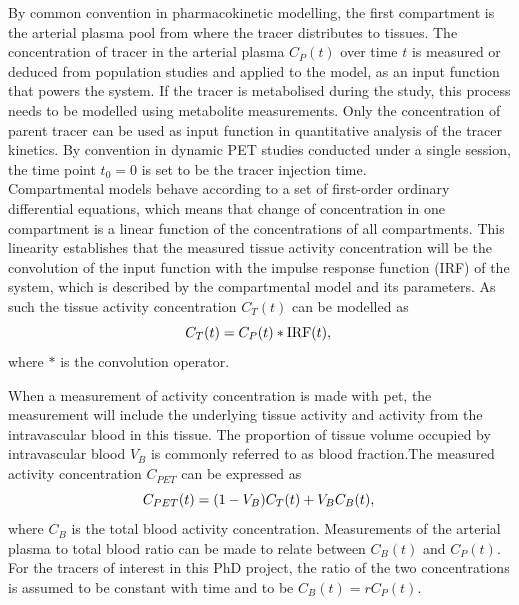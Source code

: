 By common convention in pharmacokinetic modelling, the first compartment is the arterial plasma pool from where the tracer distributes to tissues. The concentration of tracer in the arterial plasma $C_P(t)$ over time $t$ is measured or deduced from population studies and applied to the model, as an input function that powers the system.
If the tracer is metabolised during the study, this process needs to be modelled using metabolite measurements. Only the concentration of parent tracer can be used as input function in quantitative analysis of the tracer kinetics.
By convention in dynamic PET studies conducted under a single session, the time point $t_0=0$ is set to be the tracer injection time. \\
Compartmental models behave according to a set of first-order ordinary differential equations, which means that change of concentration in one compartment is a linear function of the concentrations of all compartments. This linearity establishes that the measured tissue activity concentration will be the convolution of the input function with the impulse response function (IRF) of the system, which is described by the compartmental model and its parameters.
As such the tissue activity concentration $C_T(t)$ can be modelled as
\begin{equation}
 C_T(t) = C_P(t) \ast \textrm{IRF}(t)  \\ , \\ 
\end{equation}
where $\ast$ is the convolution operator. 

When a measurement of activity concentration is made with \gls{pet}, the measurement will include the underlying tissue activity and activity from the intravascular blood in this tissue. The proportion of tissue volume occupied by intravascular blood $V_B$ is commonly referred to as blood fraction.The measured activity concentration $C_{PET}$ can be expressed as
\begin{equation}
{C_{PET}}(t)  = (1-V_{B}){C_{T}}(t) + V_{B}C_{B}(t) \\ , \\
\label{eqn:CPET}
\end{equation}
where $C_{B}$ is the total blood activity concentration.
Measurements of the %
arterial plasma to total blood ratio can be made to relate between $C_{B}(t)$ and $C_P(t)$. 
For the tracers of interest in this PhD project, the ratio of the two concentrations is assumed to be constant with time and to be $C_{B}(t) = r C_{P}(t)$. 

